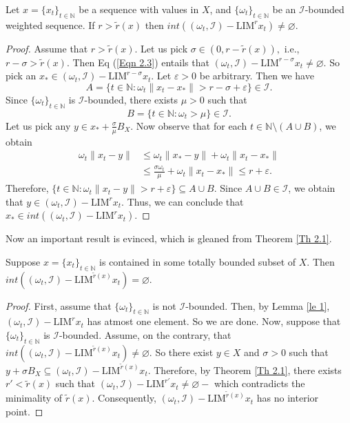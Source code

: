 \documentclass[reqno]{amsart}
\begin{document}
{\begin{proposition}\label{Th 2.4}
	Let $x=\{x_t\}_{t\in\mathbb{N}}$ be a sequence with values in $X$, and $\{\omega_t\}_{t\in\mathbb{N}}$ be an $\mathcal{I}$-bounded weighted sequence.
	If $r>\tilde{r}(x)$ then $int((\omega_t,\mathcal{I})-\text{LIM}^{r} x_t)\neq \varnothing$. 
\end{proposition}
\begin{proof}
	Assume that $r>\tilde{r}(x).$ Let us pick $\sigma\in(0,r-\tilde{r}(x)),$ i.e., $r-\sigma>\tilde{r}(x).$ Then Eq (\ref{Eqn 2.3}) entails that $(\omega_t,\mathcal{I})-\text{LIM}^{r-\sigma} x_t\neq\varnothing$.  So pick an $x_*\in (\omega_t,\mathcal{I})-\text{LIM}^{r-\sigma} x_t.$  Let $\varepsilon>0$ be arbitrary.
	Then we have 
	  $$ 	A=\{t\in\mathbb{N}:\omega_t\|x_t-x_*\|>r-\sigma+\varepsilon\}\in\mathcal{I}.
	  $$ 
	  Since $\{\omega_t\}_{t\in\mathbb{N}}$ is $\mathcal{I}$-bounded, there exists $\mu>0$ such that 
	  $$
	  B=\{t\in\mathbb{N}:\omega_t>\mu\}\in\mathcal{I}.
	  $$
	Let us pick any  $y\in x_*+\frac{\sigma}{\mu}{B}_X$. Now observe that for each $t\in\mathbb{N}\setminus( A\cup B)$, we obtain
	\begin{align*}
		\omega_t\|x_t-y\|&\leq \omega_t\|x_*-y\|+\omega_t\|x_t-x_*\|\\
		&\leq \frac{\sigma\omega_t}{\mu}+\omega_t\|x_t-x_*\|\leq r+\varepsilon.
	\end{align*}
	Therefore, $\{t\in\mathbb{N}:\omega_t\|x_t-y\|>r+\varepsilon\}\subseteq A\cup B$.  Since $A\cup B\in\mathcal{I}$, we obtain that $y\in (\omega_t,\mathcal{I})-\text{LIM}^{r} x_t$. Thus, we can conclude that $x_*\in int((\omega_t,\mathcal{I})-\text{LIM}^{r} x_t)$.
\end{proof}
Now an important result is evinced, which is gleaned from Theorem \ref{Th 2.1}.

\begin{proposition}\label{Pro 3}
	Suppose  $x=\{x_t\}_{t\in\mathbb{N}}$ is contained in some totally bounded subset of $X$. Then $int((\omega_t,\mathcal{I})-\text{LIM}^{\tilde{r}(x)} x_t)=\varnothing$. 
\end{proposition}
\begin{proof} 
	First, assume that $\{\omega_t\}_{t\in\mathbb{N}}$ is not $\mathcal{I}$-bounded. Then, by Lemma \ref{le 1}, $(\omega_t,\mathcal{I})-\text{LIM}^{r} x_t$ has atmost one element. So we are done. Now, suppose that $\{\omega_t\}_{t\in\mathbb{N}}$ is $\mathcal{I}$-bounded. Assume, on the contrary, that $int((\omega_t,\mathcal{I})-\text{LIM}^{\tilde{r}(x)} x_t)\neq\varnothing$. So there exist $y\in X$ and $\sigma>0$  such that $y+\sigma {B}_X\subseteq (\omega_t,\mathcal{I})-\text{LIM}^{\tilde{r}(x)} x_t$. Therefore, by Theorem \ref{Th 2.1},  there exists $r'<\tilde{r}(x)$ such that $(\omega_t,\mathcal{I})-\text{LIM}^{r'} x_t\neq\varnothing-$ which contradicts the minimality of $\tilde{r}(x)$. Consequently, $(\omega_t,\mathcal{I})-\text{LIM}^{\tilde{r}(x)} x_t$ has no interior point.
\end{proof}





}
\end{document}

